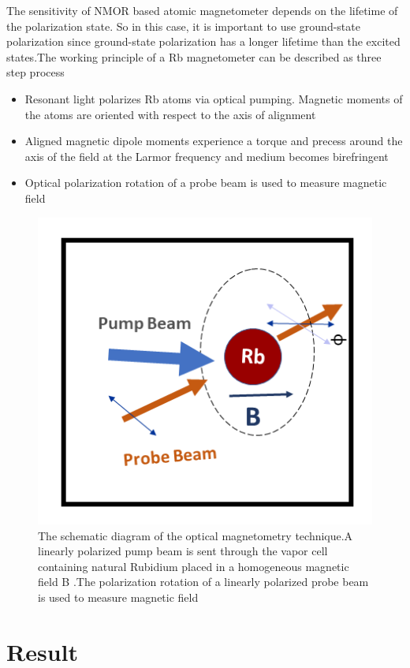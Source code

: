 \documentclass[12pt]{report}
\begin{document}
The sensitivity of NMOR based atomic magnetometer depends on the lifetime of the polarization state. So in this case, it is important to use ground-state polarization since ground-state polarization has a longer lifetime than the excited states.The working principle of a Rb magnetometer can be described as three step process
\begin{itemize}
\item
Resonant  light polarizes Rb atoms via optical pumping. Magnetic moments of the atoms are oriented with respect to the axis of alignment
\end{itemize}
\begin{itemize}
\item Aligned magnetic dipole moments experience a torque and precess around the axis of the field at the Larmor frequency and medium becomes birefringent
\end{itemize}
\begin{itemize}
\item Optical polarization rotation of a probe beam is used to measure magnetic field
\end{itemize}
\begin{figure}[h]
\centering
\includegraphics[width=0.55\linewidth]{figures/optical_pumping}
\caption{The schematic diagram of the optical magnetometry technique.A linearly polarized pump beam is sent through the vapor cell containing natural Rubidium placed in a homogeneous magnetic field B .The polarization rotation of a linearly polarized probe beam is used to measure magnetic field}
\end{figure}





\chapter{Result}
\end{document}
